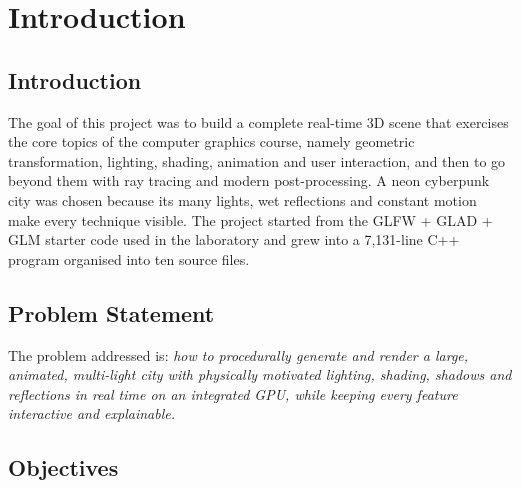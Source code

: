 \documentclass[12pt, a4paper]{report}
\begin{document}
\chapter{Introduction}

\section{Introduction}

\begin{justify}
  {\fontsize{12}{13.8}\selectfont
    The goal of this project was to build a complete real-time 3D scene that exercises the core topics of the computer graphics course, namely geometric transformation, lighting, shading, animation and user interaction, and then to go beyond them with ray tracing and modern post-processing. A neon cyberpunk city was chosen because its many lights, wet reflections and constant motion make every technique visible. The project started from the GLFW + GLAD + GLM starter code used in the laboratory and grew into a 7,131-line C++ program organised into ten source files.
  }
\end{justify}

\section{Problem Statement}

\begin{justify}
  {\fontsize{12}{13.8}\selectfont
    The problem addressed is: \textit{how to procedurally generate and render a large, animated, multi-light city with physically motivated lighting, shading, shadows and reflections in real time on an integrated GPU, while keeping every feature interactive and explainable.}
  }
\end{justify}

\section{Objectives}
\end{document}
